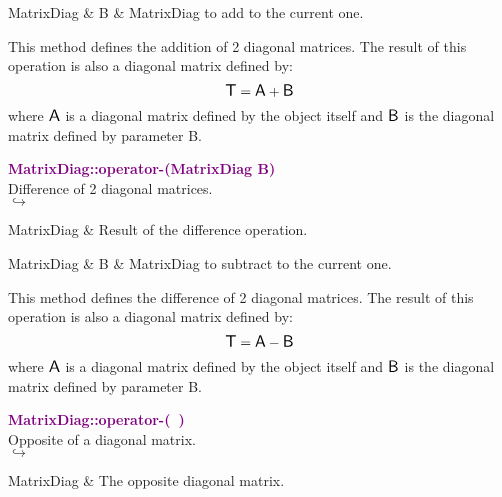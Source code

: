 \begin{tcolorbox}[width=\textwidth,myArgs,tabularx={ll|R}]
MatrixDiag & B & MatrixDiag to add to the current one.
\end{tcolorbox}

This method defines the addition of 2 diagonal matrices.
The result of this operation is also a diagonal matrix defined by:
\begin{equation*}
\mbox{\large\ensuremath{\mathsf{T}}} = \mbox{\large\ensuremath{\mathsf{A}}} + \mbox{\large\ensuremath{\mathsf{B}}}
\end{equation*}
where $\mbox{\large\ensuremath{\mathsf{A}}}$ is a diagonal matrix defined by the object itself and $\mbox{\large\ensuremath{\mathsf{B}}}$ is the diagonal matrix defined by parameter B.

\textcolor{purple}{\textbf{MatrixDiag::operator-(MatrixDiag B)}}\label{MatrixDiag::operator-(MatrixDiag B)}\\
Difference of 2 diagonal matrices.\\ \hspace*{5mm}$\hookrightarrow$
\vspace*{-2em}\begin{tcolorbox}[grow to left by=-1cm, width=\textwidth-1cm,myArgs,tabularx={l|R}]
MatrixDiag & Result of the difference operation.
\end{tcolorbox}

\begin{tcolorbox}[width=\textwidth,myArgs,tabularx={ll|R}]
MatrixDiag & B & MatrixDiag to subtract to the current one.
\end{tcolorbox}

This method defines the difference of 2 diagonal matrices.
The result of this operation is also a diagonal matrix defined by:
\begin{equation*}
\mbox{\large\ensuremath{\mathsf{T}}} = \mbox{\large\ensuremath{\mathsf{A}}} - \mbox{\large\ensuremath{\mathsf{B}}}
\end{equation*}
where $\mbox{\large\ensuremath{\mathsf{A}}}$ is a diagonal matrix defined by the object itself and $\mbox{\large\ensuremath{\mathsf{B}}}$ is the diagonal matrix defined by parameter B.

\textcolor{purple}{\textbf{MatrixDiag::operator-(~)}}\label{MatrixDiag::operator-()}\\
Opposite of a diagonal matrix.\\ \hspace*{5mm}$\hookrightarrow$
\vspace*{-2em}\begin{tcolorbox}[grow to left by=-1cm, width=\textwidth-1cm,myArgs,tabularx={l|R}]
MatrixDiag & The opposite diagonal matrix.
\end{tcolorbox}

